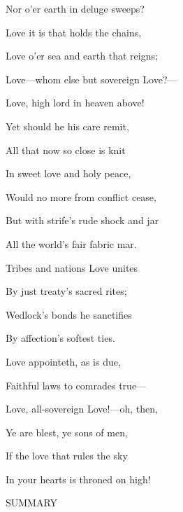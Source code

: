Nor o'er earth in deluge sweeps?

Love it is that holds the chains,

Love o'er sea and earth that reigns;

Love—whom else but sovereign Love?—

Love, high lord in heaven above!

Yet should he his care remit,

All that now so close is knit

In sweet love and holy peace,

Would no more from conflict cease,

But with strife's rude shock and jar

All the world's fair fabric mar.

Tribes and nations Love unites

By just treaty's sacred rites;

Wedlock's bonds he sanctifies

By affection's softest ties.

Love appointeth, as is due,

Faithful laws to comrades true—

Love, all-sovereign Love!—oh, then,

Ye are blest, ye sons of men,

If the love that rules the sky

In your hearts is throned on high!


SUMMARY

